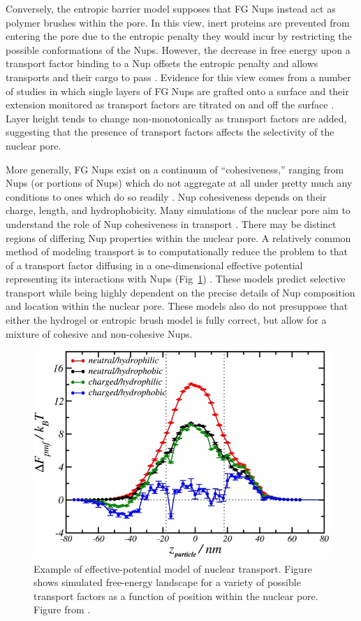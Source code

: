Conversely, the entropic barrier model supposes that FG Nups instead act as polymer brushes within the pore.  In this view, inert proteins are prevented from entering the pore due to the entropic penalty they would incur by restricting the possible conformations of the Nups.  However, the decrease in free energy upon a transport factor binding to a Nup offsets the entropic penalty and allows transports and their cargo to pass \cite{rout00, lim08}.  Evidence for this view comes from a number of studies in which single layers of FG Nups are grafted onto a surface and their extension monitored as transport factors are titrated on and off the surface \cite{wagner15,zahn16,vovk16}.  Layer height tends to change non-monotonically as transport factors are added, suggesting that the presence of transport factors affects the selectivity of the nuclear pore.


More generally, FG Nups exist on a continuum of ``cohesiveness,'' ranging from Nups (or portions of Nups) which do not aggregate at all under pretty much any conditions to ones which do so readily \cite{hough15}.  Nup cohesiveness depends on their charge, length, and hydrophobicity.  Many simulations of the nuclear pore aim to understand the role of Nup cohesiveness in transport \cite{gu19,tagliazucchi13,nasrabad16,mincer11}.  There may be distinct regions of differing Nup properties within the nuclear pore.  A relatively common method of modeling transport is to computationally reduce the problem to that of a transport factor diffusing in a one-dimensional effective potential representing its interactions with Nups (Fig~\ref{fig:effective-potential}) \cite{tagliazucchi13, zilman07,tu13, timney16}.  These models predict selective transport while being highly dependent on the precise details of Nup composition and location within the nuclear pore.  These models also do not presuppose that either the hydrogel or entropic brush model is fully correct, but allow for a mixture of cohesive and non-cohesive Nups.

\begin{figure}
\centering
\includegraphics[width=0.5\linewidth]{figs/ch01/tagliazucchi}
\caption[Effective potential model of nuclear transport.]{Example of effective-potential model of nuclear transport.  Figure shows simulated free-energy landscape for a variety of possible transport factors as a function of position within the nuclear pore. Figure from \cite{tagliazucchi13}.\\}
\label{fig:effective-potential}
\end{figure}

